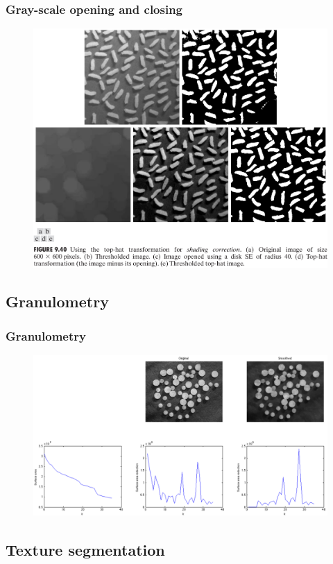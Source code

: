\begin{frame}
\frametitle{Gray-scale opening and closing}
\begin{figure}[!h]
\includegraphics[width=.8\textwidth]{fig-9-40.png}
\end{figure}
\end{frame}

\subsection{Granulometry}

\begin{frame}
\frametitle{Granulometry}
\begin{figure}[!h]
\includegraphics[width=\textwidth]{granulometry.png}
\end{figure}
\end{frame}

\subsection{Texture segmentation}

